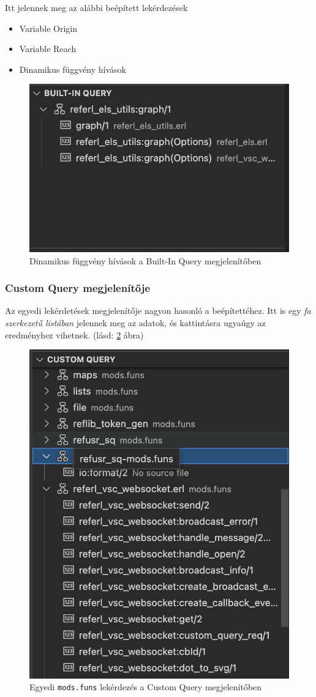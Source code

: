 Itt jelennek meg az alábbi beépített lekérdezések
\begin{itemize}
    \item Variable Origin
    \item Variable Reach
    \item Dinamikus függvény hívások
\end{itemize}

\begin{figure}[H]
  \centering
  \includegraphics[width=0.5\linewidth]{images/builtin_query.png}
  \caption{Dinamikus függvény hívások a Built-In Query megjelenítőben}
  \label{fig:bultin_query_view}
\end{figure}

\subsubsection{Custom Query megjelenítője} \label{customQueryView}

Az egyedi lekérdetések megjelenítője nagyon hasonló a beépítettéhez. Itt is egy \textit{fa szerkezetű listában} jelennek meg az adatok, és kattintásra ugyaúgy az eredményhez vihetnek.
(lásd: \ref{fig:custom_query_view} ábra)

\begin{figure}[H]
  \centering
  \includegraphics[width=0.4\linewidth]{images/custom_query.png}
  \caption{Egyedi \lstinline{mods.funs} lekérdezés a Custom Query megjelenítőben}
  \label{fig:custom_query_view}
\end{figure}

